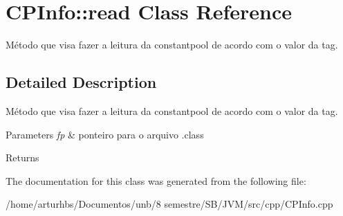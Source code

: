 \hypertarget{classCPInfo_1_1read}{}\section{C\+P\+Info\+:\+:read Class Reference}
\label{classCPInfo_1_1read}


Método que visa fazer a leitura da constantpool de acordo com o valor da tag.  




\subsection{Detailed Description}
Método que visa fazer a leitura da constantpool de acordo com o valor da tag. 


\begin{DoxyParams}{Parameters}
{\em fp} & ponteiro para o arquivo .class \\
\hline
\end{DoxyParams}
\begin{DoxyReturn}{Returns}

\end{DoxyReturn}


The documentation for this class was generated from the following file\+:\begin{DoxyCompactItemize}
\item 
/home/arturhbs/\+Documentos/unb/8 semestre/\+S\+B/\+J\+V\+M/src/cpp/C\+P\+Info.\+cpp\end{DoxyCompactItemize}
